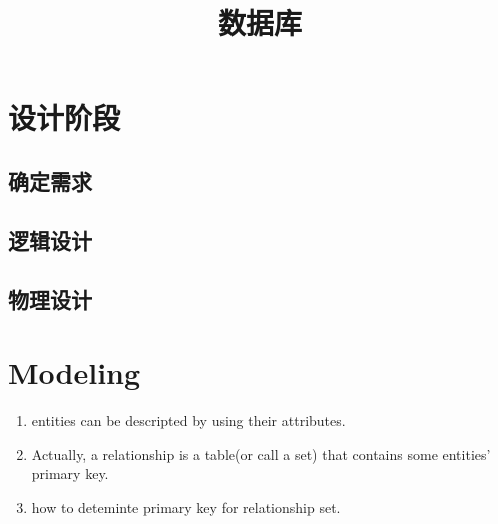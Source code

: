 \documentclass[UTF8]{article}
\title{数据库}
\author{}
\begin{document}
  \maketitle
  \section{设计阶段}%
  \label{sec:设计阶段}
  \subsection{确定需求}%
  \label{sub:确定需求}
  \subsection{逻辑设计}%
  \label{sub:设逻辑设计}
  \subsection{物理设计}%
  \label{sub:物理设计}

  \section{Modeling}%
  \label{sec:modeling}
  
  \begin{enumerate}
    \item entities can be descripted by using their attributes.
    \item Actually, a relationship is a table(or call a set) that contains some entities' primary key.
    \item how to deteminte primary key for relationship set.
  \end{enumerate}
  
\end{document}
